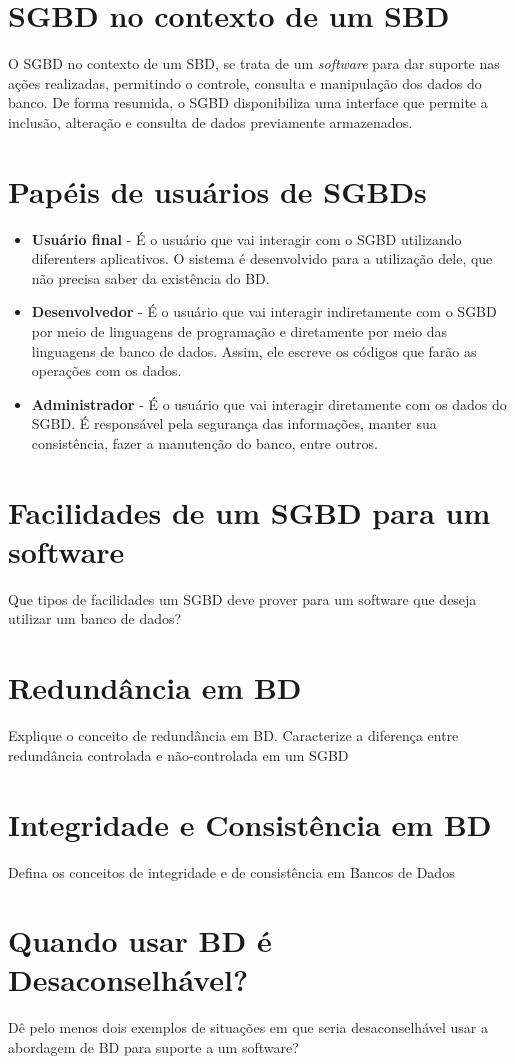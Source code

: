 \documentclass[12pt]{article}
\begin{document}
\section{SGBD no contexto de um SBD}
O SGBD no contexto de um SBD, se trata de um \textit{software} para dar suporte nas ações realizadas, permitindo o controle, consulta e manipulação dos dados do banco. De forma resumida, o SGBD disponibiliza uma interface que permite a inclusão, alteração e consulta de dados previamente armazenados.

\section{Papéis de usuários de SGBDs}
\begin{itemize}
    \item \textbf{Usuário final} - É o usuário que vai interagir com o SGBD utilizando diferenters aplicativos. O sistema é desenvolvido para a utilização dele, que não precisa saber da existência do BD.
    \item \textbf{Desenvolvedor} - É o usuário que vai interagir indiretamente com o SGBD por meio de linguagens de programação e diretamente por meio das linguagens de banco de dados. Assim, ele escreve os códigos que farão as operações com os dados.
    \item \textbf{Administrador} - É o usuário que vai interagir diretamente com os dados do SGBD. É responsável pela segurança das informações, manter sua consistência, fazer a manutenção do banco, entre outros.
\end{itemize}

\section{Facilidades de um SGBD para um software}
Que tipos de facilidades um SGBD deve prover para um software que deseja utilizar um banco de dados?

\section{Redundância em BD}
Explique o conceito de redundância em BD. Caracterize a diferença entre redundância controlada e não-controlada em um SGBD

\section{Integridade e Consistência em BD}
Defina os conceitos de integridade e de consistência em Bancos de Dados

\section{Quando usar BD é Desaconselhável?}
Dê pelo menos dois exemplos de situações em que seria desaconselhável usar a abordagem de BD para suporte a um software?
\end{document}
